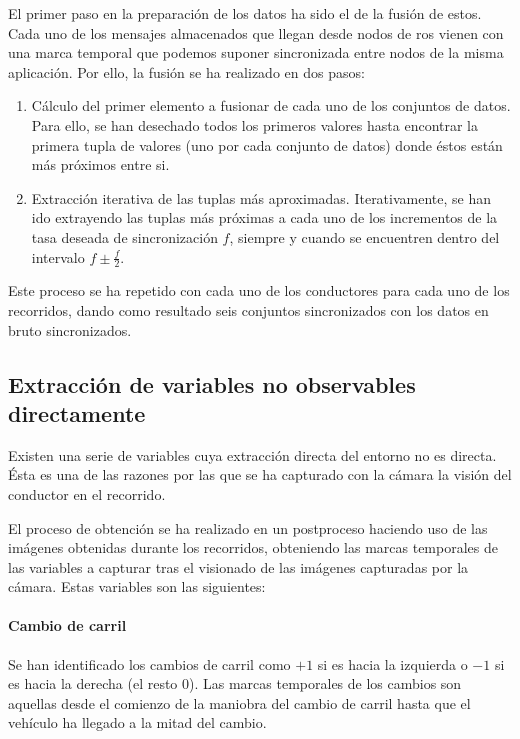 El primer paso en la preparación de los datos ha sido el de la fusión de estos. Cada uno de los mensajes almacenados que llegan desde nodos de \acrshort{ros} vienen con una marca temporal que podemos suponer sincronizada entre nodos de la misma aplicación. Por ello, la fusión se ha realizado en dos pasos:

\begin{enumerate}
	\item Cálculo del primer elemento a fusionar de cada uno de los conjuntos de datos. Para ello, se han desechado todos los primeros valores hasta encontrar la primera tupla de valores (uno por cada conjunto de datos) donde éstos están más próximos entre si.
	\item Extracción iterativa de las tuplas más aproximadas. Iterativamente, se han ido extrayendo las tuplas más próximas a cada uno de los incrementos de la tasa deseada de sincronización $f$, siempre y cuando se encuentren dentro del intervalo $f \pm \frac{f}{2}$.
\end{enumerate}

Este proceso se ha repetido con cada uno de los conductores para cada uno de los recorridos, dando como resultado seis conjuntos sincronizados con los datos en bruto sincronizados.

\subsection{Extracción de variables no observables directamente}

Existen una serie de variables cuya extracción directa del entorno no es directa. Ésta es una de las razones por las que se ha capturado con la cámara la visión del conductor en el recorrido.

El proceso de obtención se ha realizado en un postproceso haciendo uso de las imágenes obtenidas durante los recorridos, obteniendo las marcas temporales de las variables a capturar tras el visionado de las imágenes capturadas por la cámara. Estas variables son las siguientes:

\paragraph{Cambio de carril}

Se han identificado los cambios de carril como $+1$ si es hacia la izquierda o $-1$ si es hacia la derecha (el resto $0$). Las marcas temporales de los cambios son aquellas desde el comienzo de la maniobra del cambio de carril hasta que el vehículo ha llegado a la mitad del cambio.


